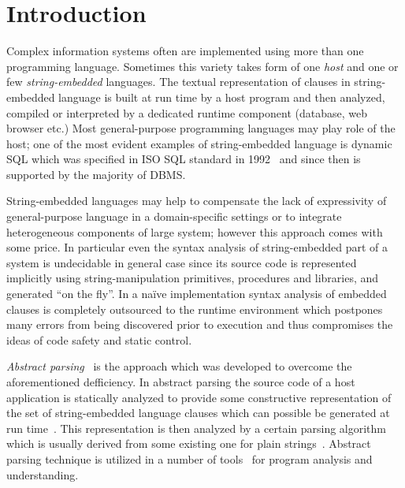 \section{Introduction}

Complex information systems often are implemented using more than one programming language. 
Sometimes this variety takes form of one \emph{host} and one or few \emph{string-embedded}
languages. The textual representation of clauses in string-embedded language is built at 
run time by a host program and then analyzed, compiled or interpreted by a dedicated 
runtime component (database, web browser etc.) Most general-purpose programming languages 
may play role of the host; one of the most evident examples of string-embedded language is 
dynamic SQL which was specified in ISO SQL standard in 1992~\cite{ISO} and since then is 
supported by the majority of DBMS. 



String-embedded languages may help to compensate the lack of expressivity of general-purpose
language in a domain-specific settings or to integrate heterogeneous components of large system;
however this approach comes with some price. In particular even the syntax analysis of 
string-embedded part of a system is undecidable in general case since its source code
is represented implicitly using string-manipulation primitives, procedures and libraries, and
generated ``on the fly''. In a na\"ive implementation syntax analysis of embedded clauses is
completely outsourced to the runtime environment which postpones many errors from being 
discovered prior to execution and thus compromises the ideas of code safety and static control.

\emph{Abstract parsing}~\cite{AbstrParsing} is the approach which was developed to overcome the 
aforementioned defficiency. In abstract parsing the source code of a host application is statically 
analyzed to provide some constructive representation of the set of string-embedded language clauses which
can possible be generated at run time~\cite{StringExpr,SAofStrVal}. This representation is then analyzed 
by a certain parsing algorithm which is usually derived from some existing one for plain strings~\cite{Grune}.
Abstract parsing technique is utilized in a number of tools~\cite{JSA,PHPSA,ALVOR1,ALVOR2} for
program analysis and understanding.

